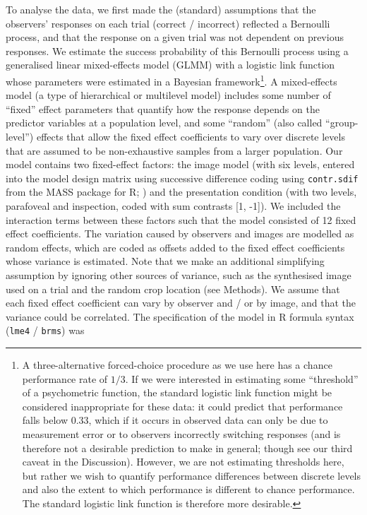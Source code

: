 \documentclass[article, 11pt,a4paper,natbib]{apa6}\usepackage[]{graphicx}\usepackage[]{color}
\begin{document}
To analyse the data, we first made the (standard) assumptions that the observers' responses on each trial (correct / incorrect) reflected a Bernoulli process, and that the response on a given trial was not dependent on previous responses.
We estimate the success probability of this Bernoulli process using a generalised linear mixed-effects model (GLMM) with a logistic link function whose parameters were estimated in a Bayesian framework\footnote{
A three-alternative forced-choice procedure as we use here has a chance performance rate of $1/3$.
If we were interested in estimating some ``threshold'' of a psychometric function, the standard logistic link function might be considered inappropriate for these data: it could predict that performance falls below 0.33, which if it occurs in observed data can only be due to measurement error or to observers incorrectly switching responses (and is therefore not a desirable prediction to make in general; though see our third caveat in the Discussion).
However, we are not estimating thresholds here, but rather we wish to quantify performance differences between discrete levels and also the extent to which performance is different to chance performance.
The standard logistic link function is therefore more desirable.
}.
A mixed-effects model (a type of hierarchical or multilevel model) includes some number of ``fixed'' effect parameters that quantify how the response depends on the predictor variables at a population level, and some ``random'' (also called ``group-level'') effects that allow the fixed effect coefficients to vary over discrete levels that are assumed to be non-exhaustive samples from a larger population.
Our model contains two fixed-effect factors: the image model (with six levels, entered into the model design matrix using successive difference coding using \texttt{contr.sdif} from the MASS package for R; \citet{venables_modern_2002}) and the presentation condition (with two levels, parafoveal and inspection, coded with sum contrasts [1, -1]).
We included the interaction terms between these factors such that the model consisted of 12 fixed effect coefficients.
The variation caused by observers and images are modelled as random effects, which are coded as offsets added to the fixed effect coefficients whose variance is estimated.
Note that we make an additional simplifying assumption by ignoring other sources of variance, such as the synthesised image used on a trial and the random crop location (see Methods).
We assume that each fixed effect coefficient can vary by observer and / or by image, and that the variance could be correlated.
The specification of the model in R formula syntax (\texttt{lme4} / \texttt{brms}) was
\end{document}

